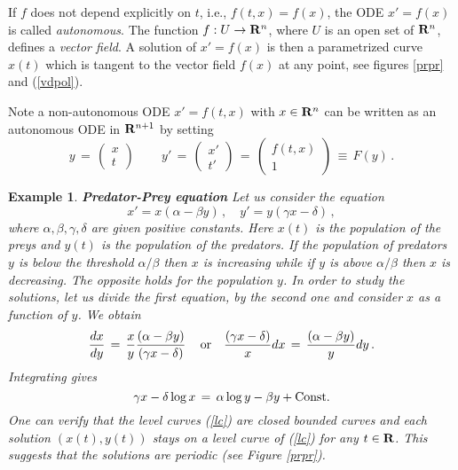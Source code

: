 \documentclass[12pt]{report}
\newcommand{\bR}{{\bf R}}
\newtheorem{example}[theorem]{Example}
\def\eqref#1{(\ref{#1})}
\def\to{\rightarrow}
\begin{document}
If $f$ does not depend explicitly on $t$, i.e., $f(t,x)=f(x)$, the
ODE $x' =f(x)$ is called {\em autonomous}.  The function $f: U \to
\bR^n$, where $U$ is an open set of $\bR^n$, defines a {\em vector
field}.  A solution of $x' =f(x)$ is then a parametrized curve $x(t)$ which
is tangent to the vector field $f(x)$ at any point, see figures \ref{prpr} and \eqref{vdpol}.   

Note a non-autonomous ODE $x'=f(t,x)$ with $x\in \bR^n$ can be written as an autonomous 
ODE in $\bR^{n+1}$ by setting 
\begin{equation}
y\,=\, \left( \begin{array}{c} x \\ t \end{array} \right) \,\quad \quad  y' \,=\, \left( \begin{array}{c}  x' \\ t' \end{array} \right)
\,=\, \left( \begin{array}{c}  f(t,x) \\ 1 \end{array} \right) \,\equiv \, F(y)\,.
\end{equation}


\begin{example}\label{prprey}{ \rm  
{\bf Predator-Prey equation} Let us consider the equation
\begin{equation}
x' = x (\alpha - \beta y) \,, \quad  y' = y (\gamma x - \delta) \,,
\end{equation}
where $\alpha, \beta, \gamma, \delta$ are given positive constants. Here $x(t)$
is the population of the preys and $y(t)$ is the population of the
predators.  If the population of predators $y$ is below the threshold
$\alpha/\beta$ then $x$ is increasing while if $y$ is above
$\alpha/\beta$ then $x$ is decreasing. The opposite holds for the
population $y$. In order to study the solutions, let us divide the
first equation, by the second one and consider $x$ as a function of
$y$. We obtain
\begin{equation}
\frac{dx}{dy} \,=\, \frac{x}{y} \frac{ (\alpha - \beta y)}{ (\gamma x
- \delta)} \, \quad {\rm or} \quad \frac{ (\gamma x - \delta)}{x} dx
\,=\, \frac{ (\alpha - \beta y)}{y} dy \,.
\end{equation}
Integrating gives 
\begin{equation}\label{lc}
\gamma x - \delta \log x  \,=\, \alpha \log y - \beta y + {\rm Const.}
\end{equation}
One can verify that the level curves \eqref{lc} are closed bounded curves 
and each solution $(x(t), y(t))$ stays on a level curve of
\eqref{lc} for any $t \in \bR$. This suggests that the solutions are
periodic (see Figure \ref{prpr}).  
}
\end{example}
\end{document}
